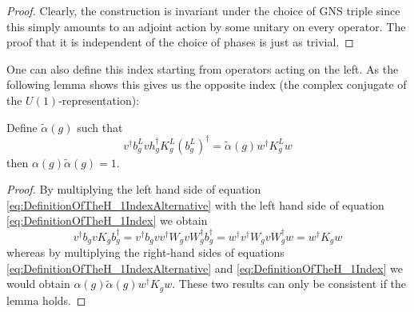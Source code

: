 \documentclass[11pt,a4paper,twoside]{article}
\numberwithin{equation}{section}
\begin{document}
	\begin{proof}
		Clearly, the construction is invariant under the choice of GNS triple since this simply amounts to an adjoint action by some unitary on every operator. The proof that it is independent of the choice of phases is just as trivial.
	\end{proof}
	One can also define this index starting from operators acting on the left. As the following lemma shows this gives us the opposite index (the complex conjugate of the $U(1)$-representation):
	\begin{lemma}
		Define $\tilde{\alpha}(g)$ such that
		\begin{equation}\label{eq:DefinitionOfTheH_1IndexAlternative}
			v^\dagger b_g^L v h_g^\dagger K_g^L (b_g^L)^\dagger=\tilde{\alpha}(g)w^\dagger K_g^L w
		\end{equation}
		then $\alpha(g)\tilde{\alpha}(g)=1$.
	\end{lemma}
	\begin{proof}
		By multiplying the left hand side of equation \eqref{eq:DefinitionOfTheH_1IndexAlternative} with the left hand side of equation \eqref{eq:DefinitionOfTheH_1Index} we obtain
		\begin{equation}
			v^\dagger b_g v K_g b_g^\dagger=v^\dagger b_g v v^\dagger W_g v W_g^\dagger b_g^\dagger=w^\dagger v^\dagger W_g v W_g^\dagger w=w^\dagger K_g w
		\end{equation}
		whereas by multiplying the right-hand sides of equations \eqref{eq:DefinitionOfTheH_1IndexAlternative} and \eqref{eq:DefinitionOfTheH_1Index} we would obtain $\alpha(g)\tilde{\alpha}(g)w^\dagger K_g w$. These two results can only be consistent if the lemma holds.
	\end{proof}
\end{document}
